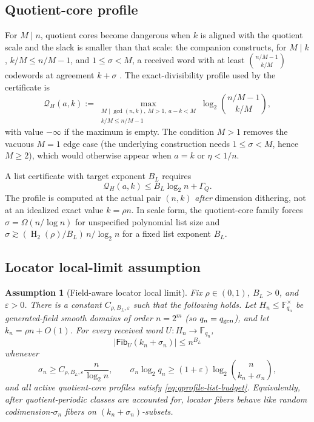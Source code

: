 \documentclass[11pt]{article}
\newtheorem{assumption}[theorem]{Assumption}
\theoremstyle{definition}
\newcommand{\F}{\mathbb F}
\newcommand{\eps}{\varepsilon}
\newcommand{\Hbin}{\operatorname{H}_2}
\newcommand{\Qprof}{\mathcal Q}
\newcommand{\qgen}{q_{\rm gen}}
\newcommand{\Fib}{\mathsf{Fib}}
\begin{document}
\subsection{Quotient-core profile}
\label{sec:qprofile}

For $M\mid n$, quotient cores become dangerous when $k$ is aligned with the quotient scale and the slack is smaller than that scale: the companion constructs, for $M\mid k$, $k/M\le n/M-1$, and $1\le\sigma<M$, a received word with at least $\binom{n/M-1}{k/M}$ codewords at agreement $k+\sigma$ \cite[Thm.~3.5]{SlackMCAEntropyMerged}.  The exact-divisibility profile used by the certificate is
\begin{equation}
\label{eq:qprofile}
        \Qprof_H(a,k)
        :=
        \max_{\substack{M\mid\gcd(n,k),\ M>1,\ a-k<M\\ k/M\le n/M-1}}
        \log_2\binom{n/M-1}{k/M},
\end{equation}
with value $-\infty$ if the maximum is empty.  The condition $M>1$ removes the vacuous $M=1$ edge case (the underlying construction needs $1\le\sigma<M$, hence $M\ge2$), which would otherwise appear when $a=k$ or $\eta<1/n$.

A list certificate with target exponent $B_L$ requires
\begin{equation}
\label{eq:qprofile-list-budget}
        \Qprof_H(a,k)\le B_L\log_2n+\Gamma_Q .
\end{equation}
The profile is computed at the actual pair $(n,k)$ \emph{after} dimension dithering, not at an idealized exact value $k=\rho n$.  In scale form, the quotient-core family forces $\sigma=\Omega(n/\log n)$ for unspecified polynomial list size and $\sigma\gtrsim(\Hbin(\rho)/B_L)\,n/\log_2n$ for a fixed list exponent $B_L$.

\subsection{Locator local-limit assumption}
\label{sec:locator}

\begin{assumption}[Field-aware locator local limit]
\label{ass:locator}
Fix $\rho\in(0,1)$, $B_L>0$, and $\eps>0$.  There is a constant $C_{\rho,B_L,\eps}$ such that the following holds.  Let $H_n\le\F_{q_n}^{\times}$ be generated-field smooth domains of order $n=2^m$ (so $q_n=\qgen$), and let $k_n=\rho n+O(1)$.  For every received word $U:H_n\to\F_{q_n}$,
\[
        |\Fib_U(k_n+\sigma_n)|\le n^{B_L}
\]
whenever
\[
        \sigma_n\ge C_{\rho,B_L,\eps}\frac n{\log_2 n},
        \qquad
        \sigma_n\log_2 q_n
        \ge (1+\eps)\log_2\binom n{k_n+\sigma_n},
\]
and all active quotient-core profiles satisfy \eqref{eq:qprofile-list-budget}.  Equivalently, after quotient-periodic classes are accounted for, locator fibers behave like random codimension-$\sigma_n$ fibers on $(k_n+\sigma_n)$-subsets.
\end{assumption}
\end{document}
